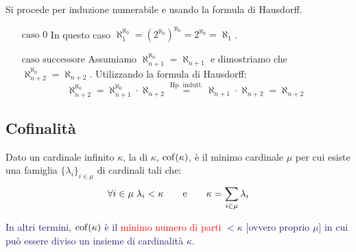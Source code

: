 \begin{soln}
	Si procede per induzione numerabile e usando la formula di Hausdorff.
	\begin{itemize}
		\item[$\boxed{\text{caso 0}}$] In questo caso $\aleph_1^{\aleph_0} = (2^{\aleph_0})^{\aleph_0} = 2^{\aleph_0} = \aleph_1$.
		\item[$\boxed{\text{caso successore}}$] Assumiamo $\aleph_{n+1}^{\aleph_0} = \aleph_{n+1}$ e dimostriamo che $\aleph_{n+2}^{\aleph_0} = \aleph_{n+2}$. Utilizzando la formula di Hausdorff:
		\[ \aleph_{n+2}^{\aleph_0} = \aleph_{n+1}^{\aleph_0} \cdot \aleph_{n+2} \overset{\text{Hp. indutt.}}{=} \aleph_{n+1} \cdot \aleph_{n+2} = \aleph_{n+2}
			\]
	\end{itemize}
\end{soln}

\pagebreak
\subsection{Cofinalità}

\begin{definition}[Cofinalità - v.1]
	Dato un cardinale infinito $\kappa$, la  di $\kappa$, $\operatorname{cof}(\kappa)$, è il minimo cardinale 
	$\mu$ per cui esiste una famiglia $\{\lambda_i\}_{i \in \mu}$ di cardinali tali che:
	\[ \forall i \in \mu \; \lambda_i < \kappa \qquad \text e \qquad \kappa = \sum_{i \in \mu} \lambda_i
		\]
\end{definition}

\textcolor{MidnightBlue}{In altri termini, $\operatorname{cof}(\kappa)$ è il \textcolor{red}{minimo numero di parti} $<\kappa$ [ovvero proprio $\mu$] in cui può essere diviso un insieme di cardinalità $\kappa$.}

